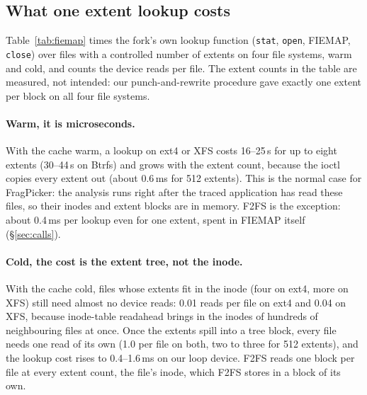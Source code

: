 \subsection{What one extent lookup costs}
\label{sec:fiemap}

Table~\ref{tab:fiemap} times the fork's own lookup function (\texttt{stat},
\texttt{open}, FIEMAP, \texttt{close}) over files with a controlled number of extents
on four file systems, warm and cold, and counts the device reads per file. The extent
counts in the table are measured, not intended: our punch-and-rewrite procedure gave
exactly one extent per block on all four file systems.

\begin{table}[t]
\caption{Extent lookup per file (median of five passes over 100--1{,}000 files), and
device reads per file in a cold pass. One thread unless stated.}
\label{tab:fiemap}
\small
{}
\end{table}

\paragraph{Warm, it is microseconds.} With the cache warm, a lookup on ext4 or XFS
costs 16--25\,\textmu s for up to eight extents (30--44\,\textmu s on Btrfs) and grows
with the extent count, because the ioctl copies every extent out (about 0.6\,ms for
512 extents). This is the normal case for FragPicker: the analysis runs right after
the traced application has read these files, so their inodes and extent blocks are in
memory. F2FS is the exception: about 0.4\,ms per lookup even for one extent, spent in
FIEMAP itself (\S\ref{sec:calls}).

\paragraph{Cold, the cost is the extent tree, not the inode.} With the cache cold,
files whose extents fit in the inode (four on ext4, more on XFS) still need almost no
device reads: 0.01 reads per file on ext4 and 0.04 on XFS, because inode-table
readahead brings in the inodes of hundreds of neighbouring files at once. Once the
extents spill into a tree block, every file needs one read of its own (1.0 per file
on both, two to three for 512 extents), and the lookup cost rises to 0.4--1.6\,ms on
our loop device. F2FS reads one block per file at every extent count, the file's
inode, which F2FS stores in a block of its own.

